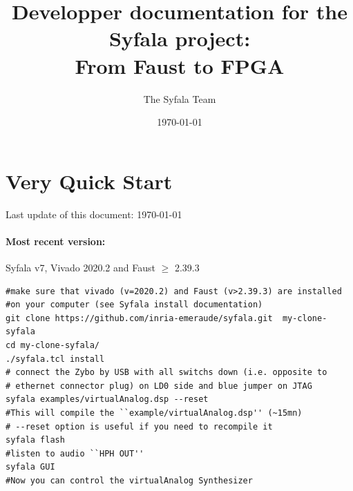 \documentclass[11pt]{article}
\title{\Large\bf Developper documentation for  the Syfala project: \\ From Faust to FPGA}
\author{The Syfala Team}
\date{\today}
\numberwithin{equation}{section}
\numberwithin{figure}{section}
\begin{document}
\maketitle

\tableofcontents

\setcounter{section}{-1}
\newpage
\section{Very Quick Start}
Last update of this document: \today

\paragraph{Most recent version:} Syfala v7, Vivado 2020.2 and Faust $\geq$ 2.39.3\\

\begin{boxedminipage}{\textwidth}
  \begin{verbatim}
#make sure that vivado (v=2020.2) and Faust (v>2.39.3) are installed
#on your computer (see Syfala install documentation)
git clone https://github.com/inria-emeraude/syfala.git  my-clone-syfala
cd my-clone-syfala/
./syfala.tcl install
# connect the Zybo by USB with all switchs down (i.e. opposite to 
# ethernet connector plug) on LD0 side and blue jumper on JTAG
syfala examples/virtualAnalog.dsp --reset
#This will compile the ``example/virtualAnalog.dsp'' (~15mn)
# --reset option is useful if you need to recompile it
syfala flash
#listen to audio ``HPH OUT''
syfala GUI
#Now you can control the virtualAnalog Synthesizer
\end{verbatim}
\end{boxedminipage}

~\\
\end{document}
